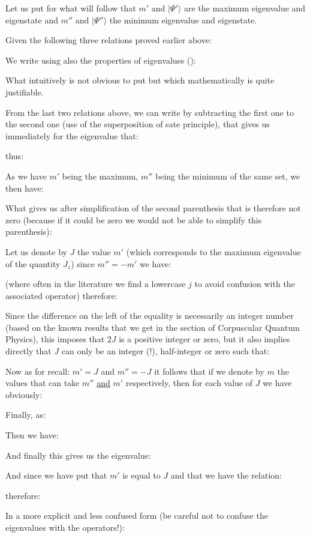 	Let us put for what will follow that $m'$ and $|\Psi'\rangle$ are the maximum eigenvalue and eigenstate and $m''$ and $|\Psi''\rangle$ the minimum eigenvalue and eigenstate.
	
	Given the following three relations proved earlier above:
	
	We write using also the properties of eigenvalues ():
	
	What intuitively is not obvious to put but which mathematically is quite justifiable.

	From the last two relations above, we can write by subtracting the first one to the second one (use of the superposition of sate principle), that gives us immediately for the eigenvalue that:
	
	thus:
	
	As we have $m'$ being the maximum, $m''$ being the minimum of the same set, we then have:
	
	What gives us after simplification of the second parenthesis that is therefore not zero (because if it could be zero we would not be able to simplify this parenthesis):
	
	Let us denote by $J$ the value $m'$ (which corresponds to the maximum eigenvalue of the quantity $J_z$) since $m''=-m'$ we have:
	
	(where often in the literature we find a lowercase $j$ to avoid confusion with the associated operator) therefore:
	
	Since the difference on the left of the equality is necessarily an integer number (based on the known results that we get in the section of Corpuscular Quantum Physics), this imposes that $2J$ is a positive integer or zero, but it also implies directly that $J$ can only be an integer (!), half-integer or zero such that:
	
	Now as for recall: $m'=J$ and $m''=-J$ it follows that if we denote by $m$ the values that can take $m''$ \underline{and} $m'$ respectively, then for each value of $J$ we have obviously:
	
	Finally, as:
	
	Then we have:
	
	And finally this gives us the eigenvalue:
	
	And since we have put that $m'$ is equal to $J$ and that we have the relation:
	
	therefore:
	
	In a more explicit and less confused form (be careful not to confuse the eigenvalues with the operators!):
	
